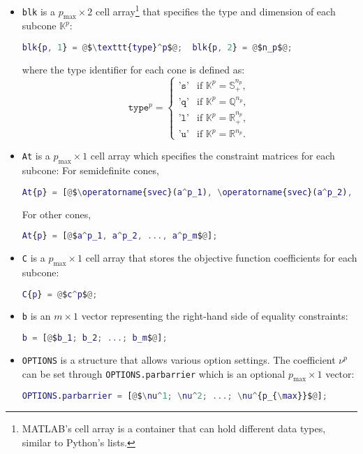 \begin{itemize}
    \item \texttt{blk} is a $p_{\max} \times 2$ cell array\footnote{MATLAB's cell array is a container that can hold different data types, similar to Python's lists.} that specifies the type and dimension of each subcone $\mathbb{K}^p$: 
\begin{lstlisting}[language=Matlab,escapechar=\@]
blk{p, 1} = @$\texttt{type}^p$@;  blk{p, 2} = @$n_p$@;
\end{lstlisting}
where the type identifier for each cone is defined as:
\[
\texttt{type}^p = \begin{cases}
\texttt{'s'} & \text{if } \mathbb{K}^p = \mathbb{S}_+^{n_p}, \\
\texttt{'q'} & \text{if } \mathbb{K}^p = \mathbb{Q}^{n_p}, \\
\texttt{'l'} & \text{if } \mathbb{K}^p = \mathbb{R}^{n_p}_+, \\
\texttt{'u'} & \text{if } \mathbb{K}^p = \mathbb{R}^{n_p}. 
\end{cases}
\]
% 
\item \texttt{At} is a $p_{\max} \times 1$ cell array which specifies the constraint matrices for each subcone: For semidefinite cones, 
\begin{lstlisting}[language=Matlab,escapechar=\@]
At{p} = [@$\operatorname{svec}(a^p_1), \operatorname{svec}(a^p_2), ..., \operatorname{svec}(a^p_m)$@];
\end{lstlisting}
For other cones,
\begin{lstlisting}[language=Matlab,escapechar=\@]
At{p} = [@$a^p_1, a^p_2, ..., a^p_m$@];
\end{lstlisting}
% 
\item \texttt{C} is a $p_{\max} \times 1$ cell array that stores the objective function coefficients for each subcone:
\begin{lstlisting}[language=Matlab,escapechar=\@]
  C{p} = @$c^p$@;
\end{lstlisting}
%
\item \texttt{b} is an $m \times 1$ vector representing the right-hand side of equality constraints:
\begin{lstlisting}[language=Matlab,escapechar=\@]
  b = [@$b_1; b_2; ...; b_m$@];
\end{lstlisting}
%
\item \texttt{OPTIONS} is a structure that allows various option settings. 
The coefficient $\nu^p$ can be set through \texttt{OPTIONS.parbarrier} which is an optional $p_{\max} \times 1$ vector:
\begin{lstlisting}[language=Matlab,escapechar=\@]
OPTIONS.parbarrier = [@$\nu^1; \nu^2; ...; \nu^{p_{\max}}$@];
\end{lstlisting}
\end{itemize}



